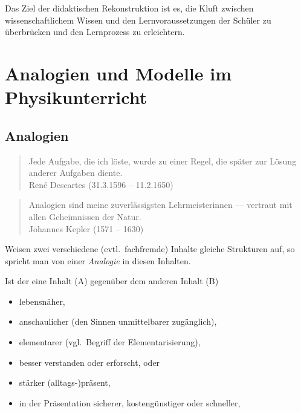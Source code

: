Das Ziel der didaktischen Rekonstruktion ist es, die Kluft zwischen wissenschaftlichem Wissen und den Lernvoraussetzungen der Sch\"{u}ler zu \"{u}berbr\"{u}cken und den Lernprozess zu erleichtern.



\bip\bip
\section{Analogien und Modelle im Physikunterricht}




\subsection{Analogien}

\begin{quote}
Jede Aufgabe, die ich l\"{o}ste, wurde zu einer Regel, die
sp\"{a}ter zur L\"{o}sung anderer Aufgaben diente.
\\ René Descartes (31.3.1596 -- 11.2.1650)
\end{quote}

\begin{quote}
Analogien sind meine zuverl\"{a}ssigsten Lehrmeisterinnen ---
vertraut mit allen Geheimnissen der Natur.
\\ Johannes Kepler (1571 -- 1630)
\end{quote}

 Weisen zwei verschiedene (evtl.\ fachfremde) Inhalte gleiche
Strukturen auf, so spricht man von einer \textit{Analogie} in diesen
Inhalten.

\bip
Ist der eine Inhalt (A) gegen\"{u}ber dem anderen Inhalt (B)
\begin{itemize}
\setlength{\itemsep}{0mm}
\item
lebensn\"{a}her,
\item
anschaulicher (den Sinnen unmittelbarer zug\"{a}nglich),
\item
elementarer (vgl.\ Begriff der Elementarisierung),
\item
besser verstanden oder erforscht, \q\q oder
\item
st\"{a}rker (alltags-)pr\"{a}sent,
\item
in der Pr\"{a}sentation sicherer, kosteng\"{u}nstiger oder schneller,
\end{itemize}

